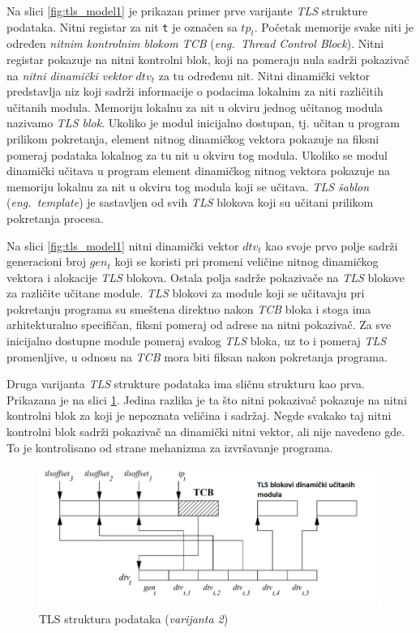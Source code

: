 \documentclass[12pt,oneside]{memoir}
\begin{document}
Na slici \ref{fig:tls_model1} je prikazan primer prve varijante \emph{TLS} strukture podataka. Nitni registar za nit \texttt{t} je označen sa \texttt{$tp_t$}. Početak  memorije svake niti je određen \emph{nitnim kontrolnim blokom \emph{TCB}} (\emph{eng.~Thread Control Block}). Nitni registar pokazuje na nitni kontrolni blok, koji na pomeraju nula sadrži pokazivač na \emph{nitni dinamički vektor} \texttt{$dtv_t$} za tu određenu nit. Nitni dinamički vektor predstavlja niz koji sadrži informacije o podacima lokalnim za niti različitih učitanih modula. Memoriju lokalnu za nit u okviru jednog učitanog modula nazivamo \emph{TLS blok}. Ukoliko je modul inicijalno dostupan, tj. učitan u program prilikom pokretanja, element nitnog dinamičkog vektora pokazuje na fiksni pomeraj podataka lokalnog za tu nit u okviru tog modula. Ukoliko se modul dinamički učitava u program element dinamičkog nitnog vektora pokazuje na memoriju lokalnu za nit u okviru tog modula koji se učitava. \emph{TLS šablon} (\emph{eng.~template}) je sastavljen od svih \emph{TLS} blokova koji su učitani prilikom pokretanja procesa.

Na slici \ref{fig:tls_model1} nitni dinamički vektor \texttt{$dtv_t$} kao svoje prvo polje sadrži generacioni broj \texttt{$gen_t$} koji se koristi pri promeni veličine nitnog dinamičkog vektora i alokacije \emph{TLS} blokova. Ostala polja sadrže pokazivače na \emph{TLS} blokove za različite učitane module. \emph{TLS} blokovi za module koji se učitavaju pri pokretanju programa su smeštena direktno nakon \emph{TCB} bloka i stoga ima arhitekturalno specifičan, fiksni pomeraj od adrese na nitni pokazivač. Za sve inicijalno dostupne module pomeraj svakog \emph{TLS} bloka, uz to i pomeraj \emph{TLS} promenljive, u odnosu na \emph{TCB} mora biti fiksan nakon pokretanja programa.

Druga varijanta \emph{TLS} strukture podataka ima sličnu strukturu kao prva. Prikazana je na slici \ref{fig:tls_model2}. Jedina razlika je ta što nitni pokazivač pokazuje na nitni kontrolni blok za koji je nepoznata veličina i sadržaj. Negde svakako taj nitni kontrolni blok sadrži pokazivač na dinamički nitni vektor, ali nije navedeno gde. To je kontrolisano od strane mehanizma za izvršavanje programa.

\begin{figure}[h!]
	\begin{center}
		\includegraphics[scale=0.6]{slike/TLSmodelV2.png}
	\end{center}
	\caption{TLS struktura podataka (\emph{varijanta 2})}
	\label{fig:tls_model2}
\end{figure}
\end{document}
